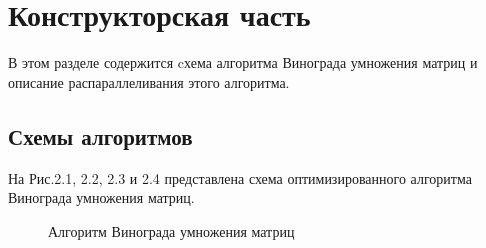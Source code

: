 \documentclass[a4paper,12pt]{report}
\begin{document}
\chapter{Конструкторская часть}
\hspace{0.6cm}В этом разделе содержится cхема алгоритма Винограда умножения матриц и описание распараллеливания этого алгоритма.
\newpage
\section{Схемы алгоритмов}

На Рис.2.1, 2.2, 2.3 и 2.4 представлена схема оптимизированного алгоритма Винограда умножения матриц.

\begin{figure}[ht!]
\caption{Алгоритм Винограда умножения матриц}
\end{figure}
\end{document}
